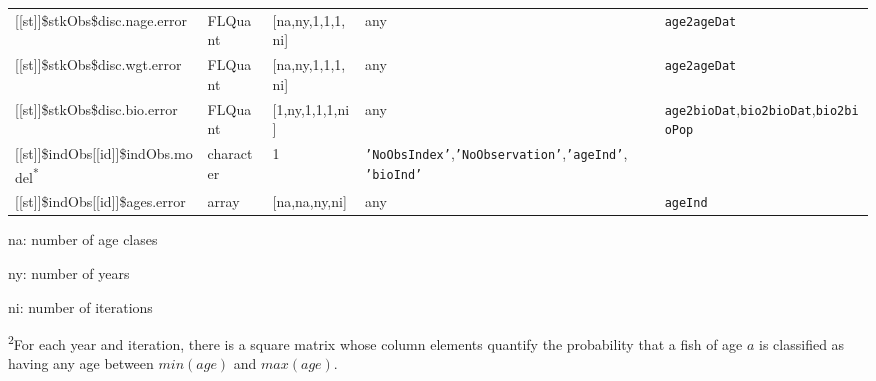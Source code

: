 \begin{landscape}
\begin{table}[!ht]
\begin{footnotesize}
\begin{threeparttable}
\begin{tabular}{lllll}
        {[[st]]}\$stkObs\$disc.nage.error & FLQuant & [na,ny,1,1,1,ni] & any & \texttt{age2ageDat} \\
        {[[st]]}\$stkObs\$disc.wgt.error & FLQuant & [na,ny,1,1,1,ni] & any & \texttt{age2ageDat} \\
        {[[st]]}\$stkObs\$disc.bio.error & FLQuant & [1,ny,1,1,1,ni] & any & \texttt{age2bioDat},\texttt{bio2bioDat},\texttt{bio2bioPop} \\
        {[[st]]}\$indObs[[id]]\$indObs.model\textsuperscript{*} & character & 1 & \texttt{'NoObsIndex'},\texttt{'NoObservation'},\texttt{'ageInd'},
          \texttt{'bioInd'} &  \\
        {[[st]]}\$indObs[[id]]\$ages.error & array & [na,na,ny,ni] & any & \texttt{ageInd} \\
        \hline
      \end{tabular}

      \begin{tablenotes}
        \item na: number of age clases
        \item ny: number of years
        \item ni: number of iterations
        \item \textsuperscript{2}For each year and iteration, there is a square matrix
          whose column elements quantify the probability that a fish of age $a$ is classified as having any age between
          $min(age)$ and $max(age)$.
      \end{tablenotes}

    \end{threeparttable}
  \end{footnotesize}

\end{table}
	

\begin{table}[!ht]


\end{table}
\end{landscape}
